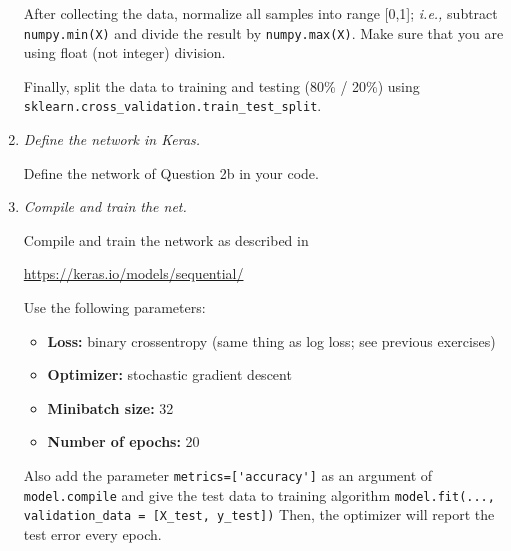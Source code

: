 \documentclass[a4paper,12pt]{scrartcl}
\newcommand{\python}{{\fbox{\texttt{\bfseries python}}\quad}}
\begin{document}
\begin{enumerate}
After collecting the data, normalize all samples into range [0,1];
\emph{i.e.,} subtract \verb+numpy.min(X)+ and divide the result
by \verb+numpy.max(X)+. Make sure that you are using float (not integer)
division.

Finally, split the data to training and testing (80\% / 20\%)
using \verb+sklearn.cross_validation.train_test_split+.

\item \python \emph{Define the network in Keras.}

Define the network of Question 2b in your code.

\item \python \emph{Compile and train the net.}

Compile and train the network as described in 

\url{https://keras.io/models/sequential/}

Use the following parameters:
\begin{itemize}
	\item \textbf{Loss:} binary crossentropy (same thing as log loss; see previous exercises)
	\item \textbf{Optimizer:} stochastic gradient descent
	\item \textbf{Minibatch size:} 32
	\item \textbf{Number of epochs:} 20
\end{itemize}
Also add the parameter \verb+metrics=['accuracy']+ as an argument of
\verb+model.compile+ and give the test data to training algorithm
\verb+model.fit(..., validation_data = [X_test, y_test])+
Then, the optimizer will report the test error every epoch.
\end{enumerate}
\end{document}
